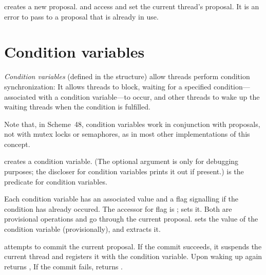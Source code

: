  creates a new proposal.
 and  access and set
 the current thread's proposal.
It is an error to pass to  a proposal that
 is already in use.


\section{Condition variables}
\label{sec:condition-variables}

\textit{Condition variables} (defined in the 
structure) allow threads perform condition synchronization: It allows
threads to block, waiting for a specified condition---associated with a
condition variable---to occur, and other threads to wake up the waiting
threads when the condition is fulfilled.

Note that, in Scheme~48, condition variables work in conjunction with
proposals, not with mutex locks or semaphores, as in most other
implementations of this concept.

\begin{protos}
\end{protos}
%
 creates a condition variable.  (The optional
 argument is only for debugging purposes; the discloser for
condition variables prints it out if present.)   is the
predicate for condition variables.

Each condition variable has an associated value and a flag
 signalling if the condition has already occured.
The accessor for flag is ;
 sets it.  Both are provisional
operations and go through the current proposal.
 sets the value of the condition variable
(provisionally), and  extracts it.

 attempts to commit the
current proposal.  If the commit succeeds, it suspends the current
thread and registers it with the  condition variable.
Upon waking up again  returns
, If the commit fails, 
returns .

